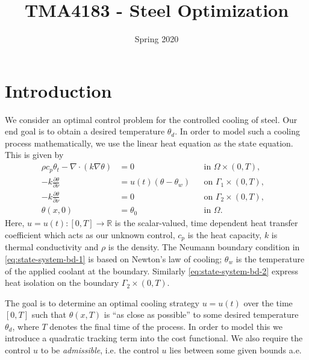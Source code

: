 \documentclass{article}
\title{TMA4183 - Steel Optimization}
\author{}
\date{Spring 2020}
\begin{document}
\maketitle

\section{Introduction}
We consider an optimal control problem for the controlled cooling of steel. Our end goal is to obtain a desired temperature $\theta_d$. In order to model such a cooling process mathematically, we use the linear heat equation as the state equation. This is given by
\begin{subequations}
   \label{eq:heat}
   \begin{align}
      \rho c_p \theta_t - \nabla \cdot (k \nabla \theta) &= 0 &&\text{in } \Omega \times (0,T),\label{eq:heat-in-omega} \\
      -k \frac{\partial \theta}{\partial \nu} &= u(t) (\theta - \theta_w) &&\text{on } \Gamma_1 \times (0,T), \label{eq:state-system-bd-1} \\
      -k \frac{\partial \theta}{\partial \nu} &= 0 &&\text{on } \Gamma_2 \times (0,T), \label{eq:state-system-bd-2} \\
      \theta(x, 0) &= \theta_0 &&\text{in } \Omega. &
   \end{align}
\end{subequations}
Here, $u = u(t) \colon [0, T] \to \mathbb{R}$ is the scalar-valued, time dependent heat transfer coefficient which acts as our unknown control, $c_p$ is the heat capacity, $k$ is thermal conductivity and $\rho$ is the density. The Neumann boundary condition in \eqref{eq:state-system-bd-1} is based on Newton's law of cooling; $\theta_w$ is the temperature of the applied coolant at the boundary. Similarly \eqref{eq:state-system-bd-2} express heat isolation on the boundary $\Gamma_2 \times (0,T)$. \bigskip 

The goal is to determine an optimal cooling strategy $u=u(t)$ over the time $[0,T]$ such that $\theta(x, T)$ is ``as close as possible'' to some desired temperature $\theta_d$, where $T$ denotes the final time of the process. In order to model this we introduce a quadratic tracking term into the cost functional. We also require the control $u$ to be \emph{admissible}, i.e. the control $u$ lies between some given bounds a.e.
\end{document}
